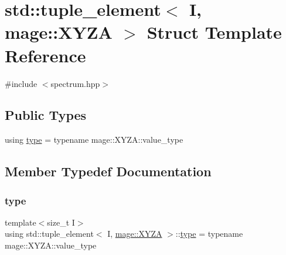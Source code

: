 \hypertarget{structstd_1_1tuple__element_3_01_i_00_01mage_1_1_x_y_z_a_01_4}{}\section{std\+:\+:tuple\+\_\+element$<$ I, mage\+:\+:X\+Y\+ZA $>$ Struct Template Reference}
\label{structstd_1_1tuple__element_3_01_i_00_01mage_1_1_x_y_z_a_01_4}


{\ttfamily \#include $<$spectrum.\+hpp$>$}

\subsection*{Public Types}
\begin{DoxyCompactItemize}
\item 
using \mbox{\hyperlink{structstd_1_1tuple__element_3_01_i_00_01mage_1_1_x_y_z_a_01_4_a92a24d062c477271f5b58fc5d8487b1c}{type}} = typename mage\+::\+X\+Y\+Z\+A\+::value\+\_\+type
\end{DoxyCompactItemize}


\subsection{Member Typedef Documentation}
\mbox{\label{structstd_1_1tuple__element_3_01_i_00_01mage_1_1_x_y_z_a_01_4_a92a24d062c477271f5b58fc5d8487b1c}} 
\subsubsection{\texorpdfstring{type}{type}}
{\footnotesize\ttfamily template$<$size\+\_\+t I$>$ \\
using std\+::tuple\+\_\+element$<$ I, \mbox{\hyperlink{structmage_1_1_x_y_z_a}{mage\+::\+X\+Y\+ZA}} $>$\+::\mbox{\hyperlink{structstd_1_1tuple__element_3_01_i_00_01mage_1_1_x_y_z_a_01_4_a92a24d062c477271f5b58fc5d8487b1c}{type}} =  typename mage\+::\+X\+Y\+Z\+A\+::value\+\_\+type}

